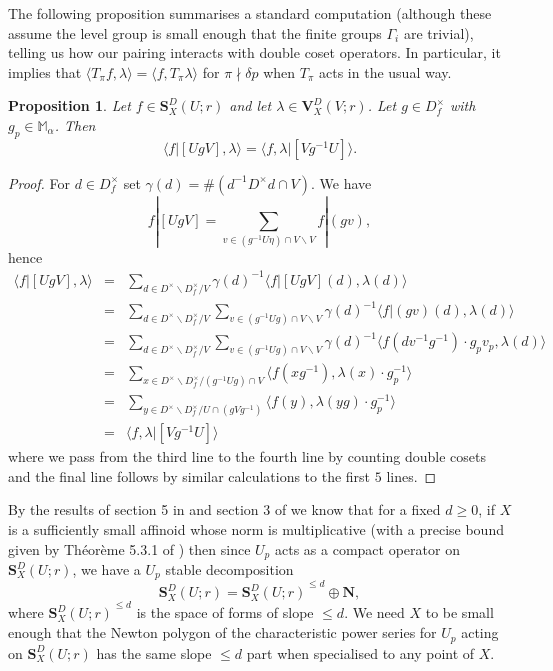 \documentclass[a4paper, notitlepage]{amsart}
\newtheorem{proposition}[theorem]{Proposition}
\newcommand{\OC}{\ensuremath{\mathbf{S}^D_{X}(U;r)}\xspace}
\begin{document}
The following proposition summarises a standard computation \cite{Ta,DT} (although these assume the level group is small enough that the finite groups $\Gamma_i$ are trivial), telling us how our pairing interacts with double coset operators. In particular, it implies that $\langle T_\pi f, \lambda \rangle = \langle f, T_\pi \lambda \rangle$ for $\pi \nmid \delta p$ when $T_\pi$ acts in the usual way.
\begin{proposition}\label{prop:pairinghecke}
Let $f \in \OC$ and let $\lambda\in \mathbf{V}^D_X(V;r)$. Let $g \in D^\times_f$ with $g_p\in\mathbb{M}_\alpha$. Then $$\langle f|[U g V],\lambda\rangle=\langle f,\lambda|[Vg^{-1}U]\rangle.$$
\end{proposition}
\begin{proof}
For $d \in D^\times_f$ set $\gamma(d)=\#(d^{-1}D^\times d \cap V)$. We have $$f|[Ug V]=\sum_{v\in (g^{-1} U\eta)\cap V \backslash V}f|(g v),$$ hence \begin{eqnarray*}\langle f|[Ug V],\lambda\rangle&=&\sum_{d\in D^\times\backslash D^\times_f/V} \gamma(d)^{-1}\langle f|[Ug V](d),\lambda(d)\rangle\\
&=&\sum_{d\in D^\times\backslash D^\times_f/V}\sum_{v\in (g^{-1} Ug)\cap V \backslash V} \gamma(d)^{-1}\langle f|(g v)(d),\lambda(d)\rangle\\
&=&\sum_{d\in D^\times\backslash D^\times_f/V}\sum_{v\in (g^{-1} Ug)\cap V \backslash V} \gamma(d)^{-1}\langle f(dv^{-1}g^{-1})\cdot g_p v_p,\lambda(d)\rangle\\
&=&\sum_{x\in D^\times\backslash D^\times_f/(g^{-1} Ug)\cap V}\langle f(xg^{-1}),\lambda(x)\cdot g_p^{-1}\rangle\\
&=&\sum_{y\in D^\times\backslash D^\times_f/U\cap(g V g^{-1})}\langle f(y),\lambda(yg)\cdot g_p^{-1}\rangle\\
&=&\langle f,\lambda|[Vg^{-1}U]\rangle
\end{eqnarray*}where we pass from the third line to the fourth line by counting  double cosets and the final line follows by similar calculations to the first $5$ lines.
\end{proof}


By the results of section 5 in \cite{Chenun} and section 3 of \cite{Bu2} we know that for a fixed $d\geq 0$, if $X$ is a sufficiently small affinoid whose norm is multiplicative (with a precise bound given by Th\'eor\`eme 5.3.1 of \cite{Chenun}) then since $U_p$ acts as a compact operator on $\OC$, we have a $U_p$ stable decomposition $$\OC=\OC^{\leq d}\oplus \mathbf{N},$$ where $\OC^{\leq d}$ is the space of forms of slope $\leq d$. We need $X$ to be small enough that the Newton polygon of the characteristic power series for $U_p$ acting on $\OC$ has the same slope $\le d$ part when specialised to any point of $X$.
\end{document}
